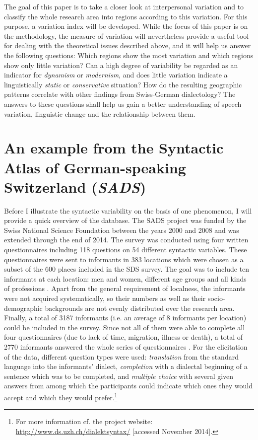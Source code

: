 \documentclass[output=paper]{LSP/langsci}
\begin{document}
The goal of this paper is to take a closer look at interpersonal variation and to classify the whole research area into regions according to this variation. For this purpose, a variation index will be developed. While the focus of this paper is on the methodology, the measure of variation will nevertheless provide a useful tool for dealing with the theoretical issues described above, and it will help us answer the following questions: Which regions show the most variation and which regions show only little variation? Can a high degree of variability be regarded as an indicator for \emph{dynamism} or \emph{modernism}, and does little variation indicate a linguistically \emph{static} or \emph{conservative} situation? How do the resulting geographic patterns correlate with other findings from Swiss-German dialectology? The answers to these questions shall help us gain a better understanding of speech variation, linguistic change and the relationship between them.

\section{An example from the Syntactic Atlas of German-speaking Switzerland (\emph{SADS})}

Before I illustrate the syntactic variability on the basis of one phenomenon, I will provide a quick overview of the database. The SADS project was funded by the Swiss National Science Foundation between the years 2000 and 2008 and was extended through the end of 2014. The survey was conducted using four written questionnaires including 118 questions on 54 different syntactic variables. These questionnaires were sent to informants in 383 locations which were chosen as a subset of the 600 places included in the SDS survey. The goal was to include ten informants at each location: men and women, different age groups and all kinds of professions \citep[52]{bucheli_syntactic_2002}. Apart from the general requirement of localness, the informants were not acquired systematically, so their numbers as well as their socio-demographic backgrounds are not evenly distributed over the research area. Finally, a total of 3187 informants (i.e. an average of 8 informants per location) could be included in the survey. Since not all of them were able to complete all four questionnaires (due to lack of time, migration, illness or death), a total of 2770 informants answered the whole series of questionnaires \citep[33]{berger_neue_2008}. For the elicitation of the data, different question types were used: \emph{translation} from the standard language into the informants’ dialect, \emph{completion} with a dialectal beginning of a sentence which was to be completed, and \emph{multiple choice} with several given answers from among which the participants could indicate which ones they would accept and which they would prefer.\footnote{For more information cf. the project website: \url{http://www.ds.uzh.ch/dialektsyntax/} [accessed November 2014].}
\end{document}
